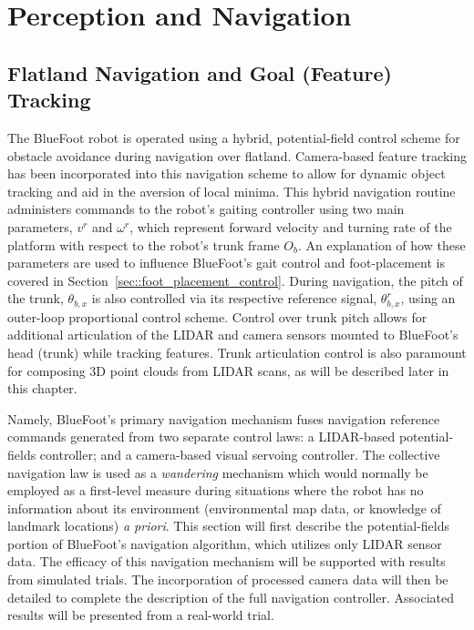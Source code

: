 \chapter{Perception and Navigation}
\label{ch::navigation}


	\section{Flatland Navigation and Goal (Feature) Tracking}
	
		The BlueFoot robot is operated using a hybrid, potential-field control scheme for obstacle avoidance during navigation over flatland. Camera-based feature tracking has been incorporated into this navigation scheme to allow for dynamic object tracking and aid in the aversion of local minima. This hybrid navigation routine administers commands to the robot's gaiting controller using two main parameters, $v^{r}$ and $\omega^{r}$, which represent forward velocity and turning rate of the platform with respect to the robot's trunk frame $O_{b}$. An explanation of how these parameters are used to influence BlueFoot's gait control and foot-placement is covered in Section~\ref{sec::foot_placement_control}. During navigation, the pitch of the trunk, $\theta_{b,x}$ is also controlled via its respective reference signal, $\theta_{b,x}^{r}$, using an outer-loop proportional control scheme. Control over trunk pitch allows for additional articulation of the LIDAR and camera sensors mounted to BlueFoot's head (trunk) while tracking features. Trunk articulation control is also paramount for composing 3D point clouds from LIDAR scans, as will be described later in this chapter.

		Namely, BlueFoot's primary navigation mechanism fuses navigation reference commands generated from two separate control laws: a LIDAR-based potential-fields controller; and a camera-based visual servoing controller. The collective navigation law is used as a \emph{wandering} mechanism which would normally be employed as a first-level measure during situations where the robot has no information about its environment (\IE environmental map data, or knowledge of landmark locations) \emph{a priori}. This section will first describe the potential-fields portion of BlueFoot's navigation algorithm, which utilizes only LIDAR sensor data. The efficacy of this navigation mechanism will be supported with results from simulated trials. The incorporation of processed camera data will then be detailed to complete the description of the full navigation controller. Associated results will be presented from a real-world trial.


